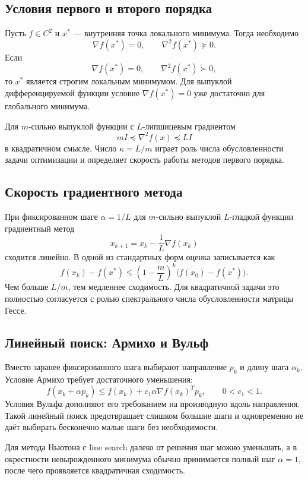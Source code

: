 \subsection{Условия первого и второго порядка}

Пусть $f\in C^2$ и $x^*$ --- внутренняя точка локального минимума. Тогда необходимо
\[
    \nabla f(x^*)=0,
    \qquad
    \nabla^2f(x^*)\succeq0.
\]
Если
\[
    \nabla f(x^*)=0,
    \qquad
    \nabla^2f(x^*)\succ0,
\]
то $x^*$ является строгим локальным минимумом. Для выпуклой дифференцируемой функции
условие $\nabla f(x^*)=0$ уже достаточно для глобального минимума.

Для $m$-сильно выпуклой функции с $L$-липшицевым градиентом
\[
    mI\preceq \nabla^2f(x)\preceq LI
\]
в квадратичном смысле. Число $\kappa=L/m$ играет роль числа обусловленности задачи
оптимизации и определяет скорость работы методов первого порядка.

\subsection{Скорость градиентного метода}

При фиксированном шаге $\alpha=1/L$ для $m$-сильно выпуклой $L$-гладкой функции
градиентный метод
\[
    x_{k+1}=x_k-\frac1L\nabla f(x_k)
\]
сходится линейно. В одной из стандартных форм оценка записывается как
\[
    f(x_k)-f(x^*)
    \le
    \left(1-\frac{m}{L}\right)^k
    \bigl(f(x_0)-f(x^*)\bigr).
\]
Чем больше $L/m$, тем медленнее сходимость. Для квадратичной задачи это полностью
согласуется с ролью спектрального числа обусловленности матрицы Гессе.

\subsection{Линейный поиск: Армихо и Вульф}

Вместо заранее фиксированного шага выбирают направление $p_k$ и длину шага $\alpha_k$.
Условие Армихо требует достаточного уменьшения:
\[
 f(x_k+\alpha p_k)
 \le
 f(x_k)+c_1\alpha\nabla f(x_k)^Tp_k,
 \qquad 0<c_1<1.
\]
Условия Вульфа дополняют его требованием на производную вдоль направления. Такой
линейный поиск предотвращает слишком большие шаги и одновременно не даёт выбирать
бесконечно малые шаги без необходимости.

Для метода Ньютона с line search далеко от решения шаг можно уменьшать, а в окрестности
невырожденного минимума обычно принимается полный шаг $\alpha=1$, после чего проявляется
квадратичная сходимость.

